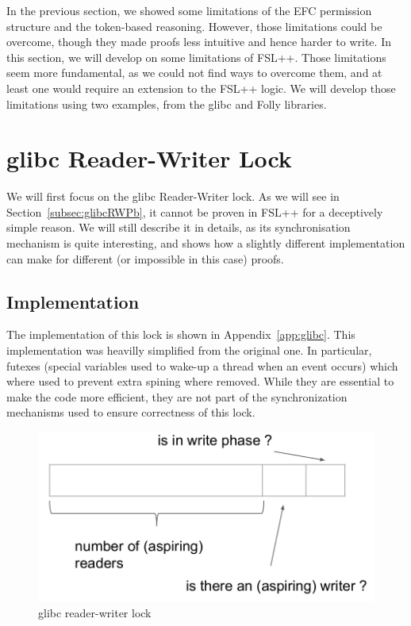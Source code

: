 In the previous section, we showed some limitations of the EFC permission structure and the token-based reasoning. However, those limitations could be overcome, though they made proofs less intuitive and hence harder to write. In this section, we will develop on some limitations of FSL++. Those limitations seem more fundamental, as we could not find ways to overcome them, and at least one would require an extension to the FSL++ logic. We will develop those limitations using two examples, from the glibc and Folly libraries.

\section{glibc Reader-Writer Lock}
We will first focus on the glibc Reader-Writer lock. As we will see in Section~\ref{subsec:glibcRWPb}, it cannot be proven in FSL++ for a deceptively simple reason. We will still describe it in details, as its synchronisation mechanism is quite interesting, and shows how a slightly different implementation can make for different (or impossible in this case) proofs.

\subsection{Implementation}
The implementation of this lock is shown in Appendix~\ref{app:glibc}. This implementation was heavilly simplified from the original one. In particular, futexes (special variables used to wake-up a thread when an event occurs) which where used to prevent extra spining where removed. While they are essential to make the code more efficient, they are not part of the synchronization mechanisms used to ensure correctness of this lock.

\begin{figure}
		\begin{center}
		\includegraphics[width=\linewidth]{schemaglibc.png}
		\caption{glibc reader-writer lock}
		\end{center}
		\label{schemaglibc}
\end{figure}

